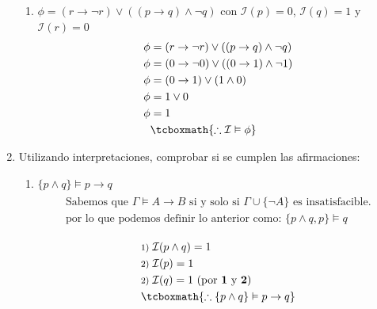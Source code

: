 \documentclass[10pt,letterpaper]{article}
\begin{document}
\begin{enumerate}
\begin{enumerate}
            \item $\phi = (r \rightarrow \neg r) \lor ((p \rightarrow q) \land \neg q)$ con
                $\mathcal{I}(p) = 0$, $\mathcal{I}(q) = 1$ y $\mathcal{I}(r) = 0$
                \begin{equation*} \begin{split} \begin{aligned}
                    \phi &= (r \rightarrow \neg r) \lor ((p \rightarrow q) \land \neg q) \\
                    \phi &= (0 \rightarrow \neg 0) \lor ((0 \rightarrow 1) \land \neg 1) \\
                    \phi &= (0 \rightarrow 1) \lor (1 \land 0) \\
                    \phi &= 1 \lor 0 \\
                    \phi &= 1 \\
                    &\tcboxmath{\therefore \mathcal{I} \vDash \phi}
                \end{aligned} \end{split} \end{equation*}
        \end{enumerate}

    \clearpage
    \item Utilizando interpretaciones, comprobar si se cumplen las afirmaciones:

        \begin{enumerate}
            \item $\{p \land q\} \vDash p \rightarrow q$
                \begin{equation*} \begin{split} \begin{aligned}
                    \text{Sabemos que } \Gamma \vDash A \rightarrow B
                        \text{ si y solo si } \Gamma \cup \{\neg A\} \text{ es insatisfacible.} \\
                    \text{por lo que podemos definir lo anterior como: } \{p \land q, p\} \vDash q\\
                \end{aligned} \end{split} \end{equation*}
                \begin{equation*} \begin{split} \begin{aligned}
                    &\text{\footnotesize{1)} } \mathcal{I}(p \land q) = 1 \\
                    &\text{\footnotesize{2)} } \mathcal{I}(p) = 1 \\
                    &\text{\footnotesize{2)} } \mathcal{I}(q) = 1 \text{ (por \textbf{1} y \textbf{2})}\\
                    &\tcboxmath{\therefore \{p \land q\} \vDash p \rightarrow q}
                \end{aligned} \end{split} \end{equation*}
        \end{enumerate}
\end{enumerate}
\end{document}
